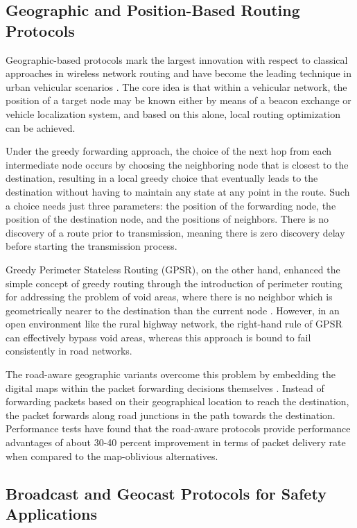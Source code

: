\documentclass[12pt]{article}
\begin{document}
\subsection{Geographic and Position-Based Routing Protocols}

Geographic-based protocols mark the largest innovation with respect to classical approaches in wireless network routing and have become the leading technique in urban vehicular scenarios \cite{mauve2001survey}. The core idea is that within a vehicular network, the position of a target node may be known either by means of a beacon exchange or vehicle localization system, and based on this alone, local routing optimization can be achieved.

Under the greedy forwarding approach, the choice of the next hop from each intermediate node occurs by choosing the neighboring node that is closest to the destination, resulting in a local greedy choice that eventually leads to the destination without having to maintain any state at any point in the route. Such a choice needs just three parameters: the position of the forwarding node, the position of the destination node, and the positions of neighbors. There is no discovery of a route prior to transmission, meaning there is zero discovery delay before starting the transmission process.

Greedy Perimeter Stateless Routing (GPSR), on the other hand, enhanced the simple concept of greedy routing through the introduction of perimeter routing for addressing the problem of void areas, where there is no neighbor which is geometrically nearer to the destination than the current node \cite{karp2000gpsr}. However, in an open environment like the rural highway network, the right-hand rule of GPSR can effectively bypass void areas, whereas this approach is bound to fail consistently in road networks.

The road-aware geographic variants overcome this problem by embedding the digital maps within the packet forwarding decisions themselves \cite{nzouonta2009vanet}. Instead of forwarding packets based on their geographical location to reach the destination, the packet forwards along road junctions in the path towards the destination. Performance tests have found that the road-aware protocols provide performance advantages of about 30-40 percent improvement in terms of packet delivery rate when compared to the map-oblivious alternatives.

\subsection{Broadcast and Geocast Protocols for Safety Applications}
\end{document}
